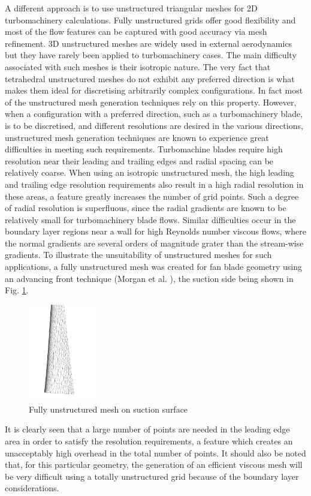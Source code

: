  A different approach is to use unstructured triangular meshes
 for 2D turbomachinery calculations. Fully unstructured grids
 offer good flexibility and most of the flow features can be captured with
 good accuracy via mesh refinement.
 3D unstructured meshes are widely used in external aerodynamics but
 they have rarely been applied to turbomachinery cases.
 The main difficulty associated with such meshes is their isotropic
 nature. The very fact that tetrahedral unstructured meshes do not exhibit
 any preferred direction is what makes them ideal for discretising arbitrarily
 complex configurations. In fact most of the unstructured mesh generation
 techniques rely on this property.
 However, when a configuration with a preferred direction, such as a
 turbomachinery blade, is to be discretised,
 and different resolutions  are desired in the various directions, unstructured mesh
 generation techniques are known to experience great difficulties in
 meeting such requirements. Turbomachine blades require high resolution near
 their leading and trailing edges and radial spacing can be relatively coarse.
 When using an isotropic unstructured mesh,
 the high leading and trailing edge resolution requirements also result in
 a high radial resolution in these areas, a feature greatly increases the
 number of grid points. Such a degree of radial resolution is superfluous,
 since the radial gradients are known to be relatively small for turbomachinery
 blade flows.
 Similar difficulties occur in the boundary layer regions near a wall for
 high Reynolds number viscous flows, where the normal gradients are several
 orders of magnitude grater than the stream-wise gradients.
 To illustrate the unsuitability of unstructured meshes
 for such applications, a fully unstructured mesh was created for fan blade
 geometry using an advancing front technique (Morgan et al. ),
 the suction side being shown in Fig. \ref{unstruct.fig}.
%
\begin{figure}[ht]
   \centerline{\includegraphics[width=30mm,clip=t]{CHAP_MESH/FIGURE/unstruct.pdf}}
   \caption{Fully unstructured mesh on suction surface}
   \label{unstruct.fig}
\end{figure}
%
 It is clearly seen that a large number of points are needed in the leading
 edge area in order to satisfy the resolution
 requirements, a feature which creates an unacceptably high overhead
 in the total number of points. It should also be noted that, for
 this particular geometry, the generation of an efficient viscous mesh
 will be very difficult using a totally unstructured grid because of the
 boundary layer considerations.

